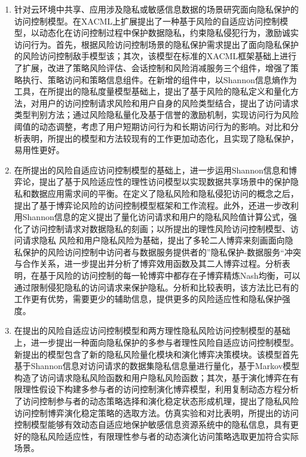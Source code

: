 \begin{enumerate}
	\item 针对云环境中共享、应用涉及隐私或敏感信息数据的场景研究面向隐私保护的访问控制模型。在XACML上扩展提出了一种基于风险的自适应访问控制模型，以动态化在访问控制过程中保护数据隐私，约束隐私侵犯行为，激励诚实访问行为。首先，根据风险访问控制场景的隐私保护需求提出了面向隐私保护的风险访问控制敌手模型该；其次，该模型在标准的XACML框架基础上进行了扩展，改进了策略风险评估、会话控制和风险消减服务三个组件，增强了策略执行、策略访问和策略信息组件。在新增的组件中，以Shannon信息熵作为工具，在所提出的隐私度量模型基础上，提出了基于风险的隐私定义和量化方法，对用户的访问控制请求风险和用户自身的风险类型结合，提出了访问请求类型判别方法；通过风险隐私量化及基于信誉的激励机制，实现访问行为风险阈值的动态调整，考虑了用户短期访问行为和长期访问行为的影响。对比和分析表明，所提出的模型和方法较现有的工作更加动态化，且实现了隐私保护，易用性更好。
	
	\item 在所提出的风险自适应访问控制模型的基础上，进一步运用Shannon信息和博弈论，提出了基于风险适应性的理性访问模型以实现数据共享场景中的保护隐私和数据应用需求间的平衡。在定义了隐私风险和隐私侵犯访问的概念之后，提出了基于博弈论风险的访问控制模型框架和工作流程。此外，还进一步改利用Shannon信息的定义提出了量化访问请求和用户的隐私风险值计算公式，强化了访问控制请求对数据隐私的刻画；以所提出的理性风险访问控制模型、访问请求隐私 风险和用户隐私风险为基础，提出了多轮二人博弈来刻画面向隐私保护的风险访问控制中访问者与数据服务提供者的”隐私保护-数据服务“冲突与合作关系，进一步提出并分析了博弈效用函数及其二人博弈过程。分析表明，在基于风险的访问控制的每一轮博弈中都存在子博弈精炼Nash均衡，可以通过限制侵犯隐私的访问请求来保护隐私。分析和比较表明，该方法比已有的工作更有优势，需要更少的辅助信息，提供更多的风险适应性和隐私保护强度。
	
	\item 在提出的风险自适应访问控制模型和两方理性隐私风险访问控制模型的基础上，进一步提出一种面向隐私保护的多参与者理性风险自适应访问控制模型。新提出的模型包含了新的隐私风险量化模块和演化博弈决策模块。该模型首先基于Shannon信息对访问请求的数据集隐私信息量进行量化，基于Markov模型构造了访问请求隐私风险函数和用户隐私风险函数；其次，基于演化博弈在有限理性假设下构建多参与者的访问控制演化博弈模型，利用复制动态方程分析了访问控制参与者的动态策略选择和演化稳定状态形成机理，提出了隐私风险访问控制博弈演化稳定策略的选取方法。仿真实验和对比表明，所提出的访问控制模型能够有效动态自适应地保护敏感信息资源系统中的隐私信息，具有更好的隐私风险适应性，有限理性参与者的动态演化访问策略选取更加符合实际场景。
	
\end{enumerate}

